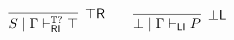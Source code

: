 \documentclass[submission,copyright,creativecommons]{eptcs}
\theoremstyle{definition}
\newcommand{\tl}{\otimes \mathsf{L}}
\newcommand{\tr}{\otimes \mathsf{R}}
\newcommand{\pass}{\mathsf{pass}}
\newcommand{\unitl}{\mathsf{IL}}
\newcommand{\unitr}{\mathsf{IR}}
\newcommand{\andlone}{\land \mathsf{L}_{1}}
\newcommand{\andltwo}{\land \mathsf{L}_{2}}
\newcommand{\andr}{\land \mathsf{R}}
\newcommand{\orl}{\lor \mathsf{L}}
\newcommand{\orrone}{\lor \mathsf{R}_{1}}
\newcommand{\orrtwo}{\lor \mathsf{R}_{2}}
\newcommand{\ax}{\mathsf{ax}}
\newcommand{\ot}{\otimes}
\newcommand{\I}{\mathsf{I}}
\newcommand{\RI}{\mathsf{RI}}
\newcommand{\LI}{\mathsf{LI}}
\newcommand{\F}{\mathsf{F}}
\newcommand{\tP}{\mathbb{P}}
\newcommand{\tCone}{\mathbb{C}_1}
\newcommand{\tCtwo}{\mathbb{C}_2}
\newcommand{\tE}{\mathbb{R}}
\newcommand{\tT}{\mathbb{T}}
\newcommand{\topr}{\top \mathsf{R}}
\newcommand{\botl}{\bot \mathsf{L}}
\newcommand{\proofbox}[1]{\begin{tabular}{l} #1 \end{tabular}}
\begin{document}
\begin{equation*}\label{eq:focus:units}
  \begin{array}{c}
    \infer[\topr]{S \mid \Gamma \vdash^{\tT?}_{\RI} \top}{}
    \qquad
    \infer[\botl]{\bot \mid \Gamma \vdash_{\LI} P}{}
  \end{array}
\end{equation*}
\end{document}
